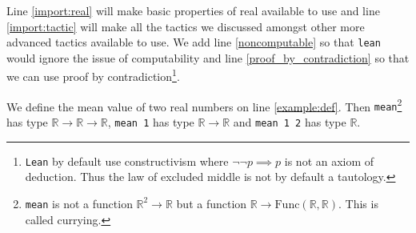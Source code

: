 \documentclass{report}
\theoremstyle{definition}
\theoremstyle{plain}
\begin{document}
Line \ref{import:real} will make basic properties of real available to use and line \ref{import:tactic} will make all the tactics we discussed amongst other more advanced tactics available to use. We add line \ref{noncomputable} so that {\tt \small lean} would ignore the issue of computability and line \ref{proof_by_contradiction} so that we can use proof by contradiction\footnote{{\tt \small Lean} by default use constructivism where $\neg\neg p\implies p$ is not an axiom of deduction. Thus the law of excluded middle is not by default a tautology.}. 

We define the mean value of two real numbers on line \ref{example:def}. Then {\tt \small mean}\footnote{{\tt \small mean} is not a function $\mathbb R^2\to\mathbb R$ but a function $\mathbb R\to\mathrm{Func}(\mathbb R,\mathbb R)$. This is called currying.} has type $\mathbb R\to \mathbb R\to \mathbb R$, {\tt \small mean 1} has type $\mathbb R\to \mathbb R$ and {\tt \small mean 1 2} has type $\mathbb R$. 
\end{document}
